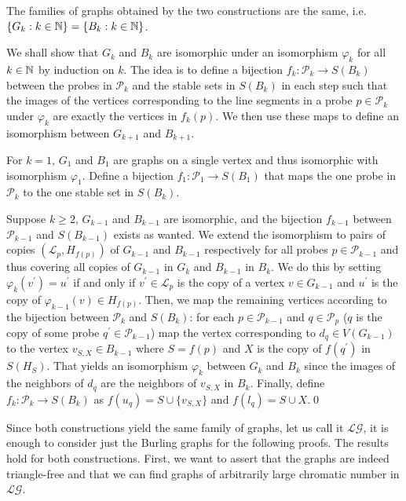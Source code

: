 \begin{lemma}
The families of graphs obtained by the two constructions are the same, i.e. $\lbrace G_k :k\in\mathbb{N}\rbrace=\lbrace B_k :k\in\mathbb{N}\rbrace$. 
\end{lemma}
\begin{prf}
We shall show that $G_k$ and $B_k$ are isomorphic under an isomorphism $\varphi_k$ for all $k\in\mathbb{N}$ by induction on $k$. The idea is to define a bijection $f_k:\mathcal{P}_k\to S(B_k)$ between the probes in $\mathcal{P}_k$ and the stable sets in $S(B_k)$ in each step such that the images of the vertices corresponding to the line segments in a probe $p\in\mathcal{P}_k$ under $\varphi_k$ are exactly the vertices in $f_k(p)$. We then use these maps to define an isomorphism between $G_{k+1}$ and $B_{k+1}$.

For $k=1$, $G_1$ and $B_1$ are graphs on a single vertex and thus isomorphic with isomorphism $\varphi_1$. Define a bijection $f_1:\mathcal{P}_1\to S(B_1)$ that maps the one probe in $\mathcal{P}_k$ to the one stable set in $S(B_k)$.

Suppose $k\geq 2$, $G_{k-1}$ and $B_{k-1}$ are isomorphic, and the bijection $f_{k-1}$ between $\mathcal{P}_{k-1}$ and $S(B_{k-1})$ exists as wanted. We extend the isomorphism to pairs of copies $(\mathcal{L}_p, H_{f(p)})$ of $G_{k-1}$ and $B_{k-1}$ respectively for all probes $p\in \mathcal{P}_{k-1}$ and thus covering all copies of $G_{k-1}$ in $G_k$ and $B_{k-1}$ in $B_{k}$. We do this by setting $\varphi_k (v^\prime)=u^\prime$ if and only if $v^\prime\in \mathcal{L}_p$ is the copy of a vertex $v\in G_{k-1}$ and $u^\prime$ is the copy of $\varphi_{k-1}(v)\in H_{f(p)}$. Then, we map the remaining vertices according to the bijection between $\mathcal{P}_k$ and $S(B_k)$: for each $p\in\mathcal{P}_{k-1}$ and $q\in\mathcal{P}_p$ ($q$ is the copy of some probe $q^\prime\in\mathcal{P}_{k-1}$) map the vertex corresponding to $d_q\in V(G_{k-1})$ to the vertex $v_{S,X}\in B_{k-1}$ where $S=f(p)$ and $X$ is the copy of $f(q^\prime)$ in $S(H_S)$. That yields an isomorphism $\varphi_k$ between $G_k$ and $B_k$ since the images of the neighbors of $d_q$ are the neighbors of $v_{S,X}$ in $B_k$. Finally, define $f_k:\mathcal{P}_k\to S(B_k)$ as $f(u_q)= S\cup \lbrace v_{S,X}\rbrace$ and $f(l_q)= S\cup X$.\qed
\end{prf}

Since both constructions yield the same family of graphs, let us call it $\mathcal{LG}$, it is enough to consider just the Burling graphs for the following proofs. The results hold for both constructions. First, we want to assert that the graphs are indeed triangle-free and that we can find graphs of arbitrarily large chromatic number in $\mathcal{LG}$.


